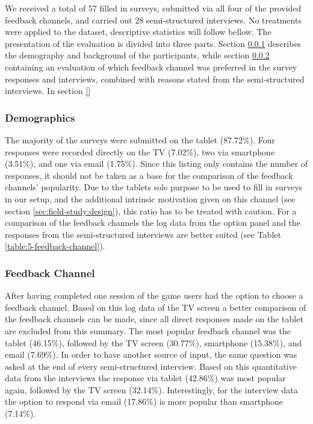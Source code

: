 	We received a total of 57 filled in surveys, submitted via all four of the provided feedback channels, and carried out 28 semi-structured interviews. 
	No treatments were applied to the dataset, descriptive statistics will follow bellow. The presentation of the evaluation is divided into three parts. Section \ref{5:results:demographics} describes the demography and background of the participants, while section \ref{5:results:feedback-channel} containing an evaluation of which feedback channel was preferred in the survey responses and interviews, combined with reasons stated from the semi-structured interviews. In section \ref{} 


	\subsubsection{Demographics}
	\label{5:results:demographics}

	The majority of the surveys were submitted on the tablet (87.72\%). Four responses were recorded directly on the TV (7.02\%), two via smartphone (3.51\%), and one via email (1.75\%). Since this listing only contains the number of responses, it should not be taken as a base for the comparison of the feedback channels' popularity. %
	Due to the tablets sole purpose to be used to fill in surveys in our setup, and the additional intrinsic motivation given on this channel (see section \ref{sec:field-study:design}), this ratio has to be treated with caution. For a comparison of the feedback channels the log data from the option panel and the responses from the semi-structured interviews are better suited (see Tablet \ref{table:5-feedback-channel}).


	\subsubsection{Feedback Channel}
	\label{5:results:feedback-channel}

	After having completed one session of the game users had the option to choose a feedback channel. Based on this log data of the TV screen a better comparison of the feedback channels can be made, since all direct responses made on the tablet are excluded from this summary. The most popular feedback channel was the tablet (46.15\%), followed by the TV screen (30.77\%), smartphone (15.38\%), and email (7.69\%).
	In order to have another source of input, the same question was asked at the end of every semi-structured interview. Based on this quantitative data from the interviews the response via tablet (42.86\%) was most popular again, followed by the TV screen (32.14\%). Interestingly, for the interview data the option to respond via email (17.86\%) is more popular than smartphone (7.14\%). 
		
